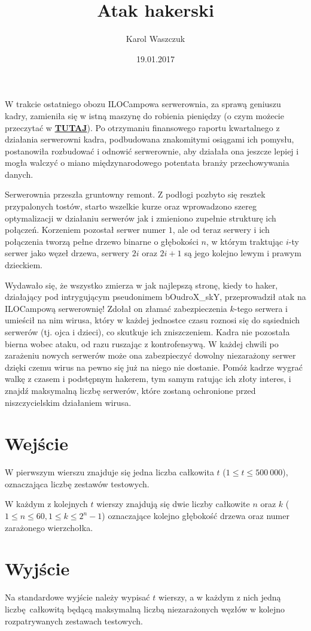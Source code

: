 \documentclass[zad,zawodnik,utf8]{sinol}
\title{Atak hakerski}
\author{Karol Waszczuk} %
\date{19.01.2017}
\begin{document}
\begin{tasktext}%

W trakcie ostatniego obozu ILOCampowa serwerownia, za sprawą geniuszu kadry, zamieniła się w istną maszynę do robienia pieniędzy (o czym możecie przeczytać w \href{https://ilocamp14.ilo.pl/pliki/srw.pdf}{\textbf{TUTAJ}}). Po otrzymaniu finansowego raportu kwartalnego z działania serwerowni kadra, podbudowana znakomitymi osiągami ich pomysłu, postanowiła rozbudować i odnowić serwerownie, aby działała ona jeszcze lepiej i mogła walczyć o miano międzynarodowego potentata branży przechowywania danych.

Serwerownia przeszła gruntowny remont. Z podłogi pozbyto się resztek przypalonych tostów, starto wszelkie kurze oraz wprowadzono szereg optymalizacji w działaniu serwerów jak i zmieniono zupełnie strukturę ich połączeń. Korzeniem pozostał serwer numer $1$, ale od teraz serwery i ich połączenia tworzą pełne drzewo binarne o głębokości $n$, w którym traktując $i$-ty serwer jako węzeł drzewa, serwery $2i$ oraz $2i + 1$ są jego kolejno lewym i prawym dzieckiem. 

Wydawało się, że wszystko zmierza w jak najlepszą stronę, kiedy to haker, działający pod intrygującym pseudonimem bOudroX\_skY, przeprowadził atak na ILOCampową serwerownię! Zdołał on złamać zabezpieczenia $k$-tego serwera i umieścił na nim wirusa, który w każdej jednostce czasu roznosi się do sąsiednich serwerów (tj. ojca i dzieci), co skutkuje ich zniszczeniem. Kadra nie pozostała bierna wobec ataku, od razu ruszając z kontrofensywą. W każdej chwili po zarażeniu nowych serwerów może ona zabezpieczyć dowolny niezarażony serwer dzięki czemu wirus na pewno się już na niego nie dostanie. Pomóż kadrze wygrać walkę z czasem i podstępnym hakerem, tym samym ratując ich złoty interes, i znajdź maksymalną liczbę serwerów, które zostaną ochronione przed niszczycielskim działaniem wirusa.

  \section{Wejście}
W pierwszym wierszu znajduje się jedna liczba całkowita $t$ ($1 \leq t \leq 500\ 000$), oznaczająca liczbę zestawów testowych.

W każdym z kolejnych $t$ wierszy znajdują się dwie liczby całkowite $n$ oraz $k$ ($1 \leq n \leq 60, 1 \leq k \leq 2^n - 1$) oznaczające kolejno głębokość drzewa oraz numer zarażonego wierzchołka. 

  \section{Wyjście}
Na standardowe wyjście należy wypisać $t$ wierszy, a w każdym z nich jedną liczbę całkowitą będącą maksymalną liczbą niezarażonych węzłów w kolejno rozpatrywanych zestawach testowych.

\makecompactexample
\end{tasktext}
\end{document}

